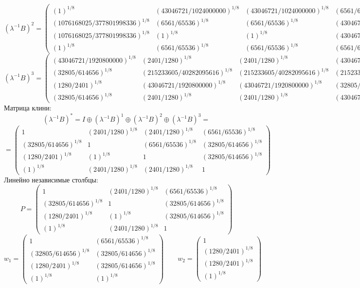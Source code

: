 $$(\lambda^{-1}B)^2 = \begin{pmatrix}
(1)^{1/8} & (43046721/1024000000)^{1/8} & (43046721/1024000000)^{1/8} & (6561/65536)^{1/8}\\
(1076168025/377801998336)^{1/8} & (6561/65536)^{1/8} & (6561/65536)^{1/8} & (43046721/377801998336)^{1/8}\\
(1076168025/377801998336)^{1/8} & (1)^{1/8} & (1)^{1/8} & (43046721/3603000625)^{1/8}\\
(1)^{1/8} & (6561/65536)^{1/8} & (6561/65536)^{1/8} & (6561/65536)^{1/8}
\end{pmatrix}
$$
$$(\lambda^{-1}B)^3 = \begin{pmatrix}
(43046721/1920800000)^{1/8} & (2401/1280)^{1/8} & (2401/1280)^{1/8} & (43046721/1920800000)^{1/8}\\
(32805/614656)^{1/8} & (215233605/40282095616)^{1/8} & (215233605/40282095616)^{1/8} & (215233605/40282095616)^{1/8}\\
(1280/2401)^{1/8} & (43046721/1920800000)^{1/8} & (43046721/1920800000)^{1/8} & (32805/614656)^{1/8}\\
(32805/614656)^{1/8} & (2401/1280)^{1/8} & (2401/1280)^{1/8} & (43046721/1920800000)^{1/8}
\end{pmatrix}
$$
Матрица клини:
$$(\lambda^{-1}B)^* = I \oplus (\lambda^{-1}B)^1 \oplus (\lambda^{-1}B)^2 \oplus (\lambda^{-1}B)^3 = $$
$$ = \begin{pmatrix}
1 & (2401/1280)^{1/8} & (2401/1280)^{1/8} & (6561/65536)^{1/8}\\
(32805/614656)^{1/8} & 1 & (6561/65536)^{1/8} & (32805/614656)^{1/8}\\
(1280/2401)^{1/8} & (1)^{1/8} & 1 & (32805/614656)^{1/8}\\
(1)^{1/8} & (2401/1280)^{1/8} & (2401/1280)^{1/8} & 1
\end{pmatrix}
$$
Линейно независимые столбцы:
$$P = \begin{pmatrix}
1 & (2401/1280)^{1/8} & (6561/65536)^{1/8}\\
(32805/614656)^{1/8} & 1 & (32805/614656)^{1/8}\\
(1280/2401)^{1/8} & (1)^{1/8} & (32805/614656)^{1/8}\\
(1)^{1/8} & (2401/1280)^{1/8} & 1
\end{pmatrix}
$$
$$w_1 = \begin{pmatrix}
1 & (6561/65536)^{1/8}\\
(32805/614656)^{1/8} & (32805/614656)^{1/8}\\
(1280/2401)^{1/8} & (32805/614656)^{1/8}\\
(1)^{1/8} & (1)^{1/8}
\end{pmatrix}
\qquad w_2 = \begin{pmatrix}
1\\
(1280/2401)^{1/8}\\
(1280/2401)^{1/8}\\
(1)^{1/8}
\end{pmatrix}
$$
